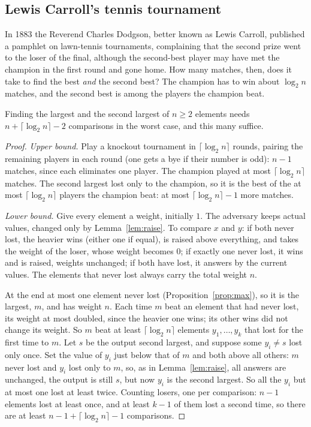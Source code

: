\subsection*{Lewis Carroll's tennis tournament}

In 1883 the Reverend Charles Dodgson, better known as Lewis Carroll, published a pamphlet on lawn-tennis tournaments, complaining that
the second prize went to the loser of the final, although the second-best player may have met the champion in the first round and gone
home. How many matches, then, does it take to find the best \emph{and} the second best? The champion has to win
about $\log_2n$ matches, and the second best is among the players the champion beat.

\begin{theorem}[Kislitsyn, 1964]\label{thm:second}
Finding the largest and the second largest of $n\ge2$ elements needs $n+\lceil\log_2n\rceil-2$ comparisons in the worst case, and this many
suffice.
\end{theorem}
\begin{proof}
\emph{Upper bound.} Play a knockout tournament in $\lceil\log_2n\rceil$ rounds, pairing the remaining players in each round (one gets a bye if
their number is odd): $n-1$ matches, since each eliminates one player. The champion played at most $\lceil\log_2n\rceil$ matches. The second
largest lost only to the champion, so it is the best of the at most $\lceil\log_2n\rceil$ players the champion beat: at most
$\lceil\log_2n\rceil-1$ more matches.

\emph{Lower bound.} Give every element a weight, initially $1$. The adversary keeps actual values, changed only by Lemma~\ref{lem:raise}. To
compare $x$ and $y$: if both never lost, the heavier wins (either one if equal), is raised above everything, and takes the weight of the
loser, whose weight becomes $0$; if exactly one never lost, it wins and is raised, weights unchanged; if both have lost, it answers by the
current values. The elements that never lost always carry the total weight $n$.

At the end at most one element never lost (Proposition~\ref{prop:max}), so it is the largest, $m$, and has weight $n$. Each time $m$ beat
an element that had never lost, its weight at most doubled, since the heavier one wins; its other wins did not change its weight. So $m$
beat at least $\lceil\log_2n\rceil$ elements $y_1,\dots,y_k$ that lost for the first time to $m$. Let $s$ be the output second largest, and suppose
some $y_i\ne s$ lost only once. Set the value of $y_i$ just below that of $m$ and both above all others: $m$ never lost and $y_i$ lost only
to $m$, so, as in Lemma~\ref{lem:raise}, all answers are unchanged, the output is still $s$, but now $y_i$ is the second largest. So all
the $y_i$ but at most one lost at least twice. Counting losers, one per comparison: $n-1$ elements lost at least once, and at least $k-1$
of them lost a second time, so there are at least $n-1+\lceil\log_2n\rceil-1$ comparisons.
\end{proof}

